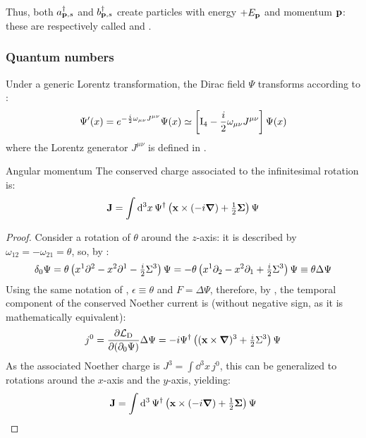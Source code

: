 Thus, both $ a_{\mathbf{p},s}^\dagger $ and $ b_{\mathbf{p},s}^\dagger $ create particles with energy $ +E_{\mathbf{p}} $ and momentum $ \mathbf{p} $: these are respectively called  and .

\subsubsection{Quantum numbers}

Under a generic Lorentz transformation, the Dirac field $ \Psi $ transforms according to :
\begin{equation}
  \Psi'(x) = e^{-\frac{i}{2} \omega_{\mu \nu} J^{\mu \nu}} \Psi(x) \simeq \left[ \mathrm{I}_4 - \frac{i}{2} \omega_{\mu \nu} J^{\mu \nu} \right] \Psi(x)
  \label{eq:dirac-inf-rot}
\end{equation}
where the Lorentz generator $ J^{\mu \nu} $ is defined in .

\begin{proposition}{Angular momentum}{}
  The conserved charge associated to the infinitesimal rotation  is:
  \begin{equation}
    \mathbf{J} = \int \mathrm{d}^3x\, \Psi^\dagger \left( \mathbf{x} \times (-i \boldsymbol{\nabla}) + \tfrac{1}{2} \boldsymbol{\Sigma} \right) \Psi
  \end{equation}
\end{proposition}

\begin{proofbox}
  \begin{proof}
    Consider a rotation of $ \theta $ around the $ z $-axis: it is described by $ \omega_{12} = - \omega_{21} = \theta $, so, by :
    \begin{equation*}
      \delta_0 \Psi = \theta \left( x^1 \partial^2 - x^2 \partial^1 - \tfrac{i}{2} \Sigma^3 \right) \Psi = - \theta \left( x^1 \partial_2 - x^2 \partial_1 + \tfrac{i}{2} \Sigma^3 \right) \Psi \equiv \theta \Delta \Psi
    \end{equation*}
    Using the same notation of , $ \epsilon \equiv \theta $ and $ F = \Delta \Psi $, therefore, by , the temporal component of the conserved Noether current is (without negative sign, as it is mathematically equivalent):
    \begin{equation*}
      j^0 = \frac{\partial \mathcal{L}_\text{D}}{\partial (\partial_0 \Psi)} \Delta \Psi = - i \Psi^\dagger \left( (\mathbf{x} \times \boldsymbol{\nabla})^3 + \tfrac{i}{2} \Sigma^3 \right) \Psi
    \end{equation*}
    As the associated Noether charge is $ J^3 = \int \dd^3x\, j^0 $, this can be generalized to rotations around the $ x $-axis and the $ y $-axis, yielding:
    \begin{equation*}
      \mathbf{J} = \int \mathrm{d}^3\, \Psi^\dagger \left( \mathbf{x} \times (-i \boldsymbol{\nabla}) + \tfrac{1}{2} \boldsymbol{\Sigma} \right) \Psi
    \end{equation*}
  \end{proof}
\end{proofbox}

